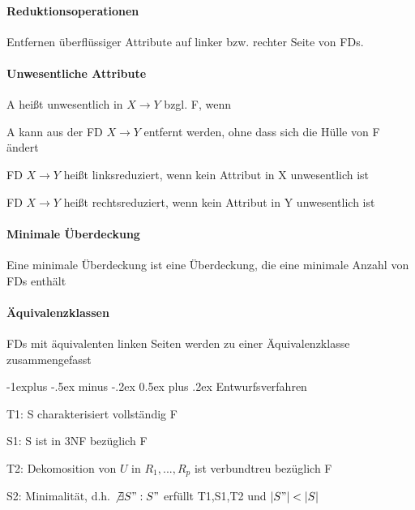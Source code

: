 \documentclass[a4paper]{article}
\makeatletter
\renewcommand{\subsection}{\@startsection{subsection}{2}{0mm}%
                                {-1explus -.5ex minus -.2ex}%
                                {0.5ex plus .2ex}%
                                {\normalfont\normalsize\bfseries}}
\makeatother
\begin{document}
\begin{multicols}{3}
    \paragraph{Reduktionsoperationen} Entfernen überflüssiger Attribute auf linker bzw. rechter Seite von FDs.

    \paragraph{Unwesentliche Attribute} A heißt unwesentlich in $X\rightarrow Y$ bzgl. F, wenn
    \begin{itemize*}
        \item A kann aus der FD $X\rightarrow Y$ entfernt werden, ohne dass sich die Hülle von F ändert
        \item FD $X\rightarrow Y$ heißt linksreduziert, wenn kein Attribut in X unwesentlich ist
        \item FD $X\rightarrow Y$ heißt rechtsreduziert, wenn kein Attribut in Y unwesentlich ist
    \end{itemize*}

    \paragraph{Minimale Überdeckung} Eine minimale Überdeckung ist eine Überdeckung, die eine minimale Anzahl von FDs enthält

    \paragraph{Äquivalenzklassen} FDs mit äquivalenten linken Seiten werden zu einer Äquivalenzklasse zusammengefasst

    \subsection{Entwurfsverfahren}
    \begin{itemize*}
        \item T1: S charakterisiert vollständig F
        \item S1: S ist in 3NF bezüglich F
        \item T2: Dekomosition von $U$ in $R_1,...,R_p$ ist verbundtreu bezüglich F
        \item S2: Minimalität, d.h. $\not\exists S":S"$ erfüllt T1,S1,T2 und $|S"|<|S|$
    \end{itemize*}


\end{multicols}
\end{document}
